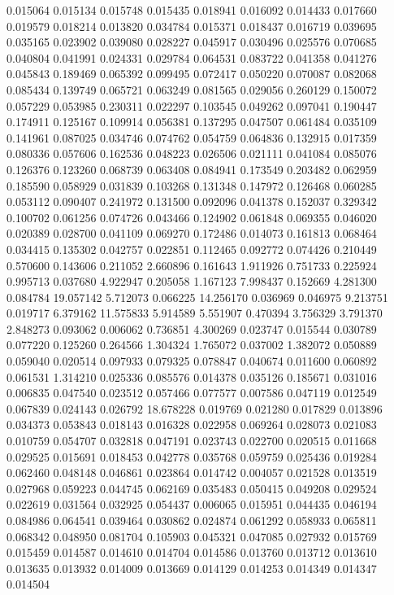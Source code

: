 0.015064
0.015134
0.015748
0.015435
0.018941
0.016092
0.014433
0.017660
0.019579
0.018214
0.013820
0.034784
0.015371
0.018437
0.016719
0.039695
0.035165
0.023902
0.039080
0.028227
0.045917
0.030496
0.025576
0.070685
0.040804
0.041991
0.024331
0.029784
0.064531
0.083722
0.041358
0.041276
0.045843
0.189469
0.065392
0.099495
0.072417
0.050220
0.070087
0.082068
0.085434
0.139749
0.065721
0.063249
0.081565
0.029056
0.260129
0.150072
0.057229
0.053985
0.230311
0.022297
0.103545
0.049262
0.097041
0.190447
0.174911
0.125167
0.109914
0.056381
0.137295
0.047507
0.061484
0.035109
0.141961
0.087025
0.034746
0.074762
0.054759
0.064836
0.132915
0.017359
0.080336
0.057606
0.162536
0.048223
0.026506
0.021111
0.041084
0.085076
0.126376
0.123260
0.068739
0.063408
0.084941
0.173549
0.203482
0.062959
0.185590
0.058929
0.031839
0.103268
0.131348
0.147972
0.126468
0.060285
0.053112
0.090407
0.241972
0.131500
0.092096
0.041378
0.152037
0.329342
0.100702
0.061256
0.074726
0.043466
0.124902
0.061848
0.069355
0.046020
0.020389
0.028700
0.041109
0.069270
0.172486
0.014073
0.161813
0.068464
0.034415
0.135302
0.042757
0.022851
0.112465
0.092772
0.074426
0.210449
0.570600
0.143606
0.211052
2.660896
0.161643
1.911926
0.751733
0.225924
0.995713
0.037680
4.922947
0.205058
1.167123
7.998437
0.152669
4.281300
0.084784
19.057142
5.712073
0.066225
14.256170
0.036969
0.046975
9.213751
0.019717
6.379162
11.575833
5.914589
5.551907
0.470394
3.756329
3.791370
2.848273
0.093062
0.006062
0.736851
4.300269
0.023747
0.015544
0.030789
0.077220
0.125260
0.264566
1.304324
1.765072
0.037002
1.382072
0.050889
0.059040
0.020514
0.097933
0.079325
0.078847
0.040674
0.011600
0.060892
0.061531
1.314210
0.025336
0.085576
0.014378
0.035126
0.185671
0.031016
0.006835
0.047540
0.023512
0.057466
0.077577
0.007586
0.047119
0.012549
0.067839
0.024143
0.026792
18.678228
0.019769
0.021280
0.017829
0.013896
0.034373
0.053843
0.018143
0.016328
0.022958
0.069264
0.028073
0.021083
0.010759
0.054707
0.032818
0.047191
0.023743
0.022700
0.020515
0.011668
0.029525
0.015691
0.018453
0.042778
0.035768
0.059759
0.025436
0.019284
0.062460
0.048148
0.046861
0.023864
0.014742
0.004057
0.021528
0.013519
0.027968
0.059223
0.044745
0.062169
0.035483
0.050415
0.049208
0.029524
0.022619
0.031564
0.032925
0.054437
0.006065
0.015951
0.044435
0.046194
0.084986
0.064541
0.039464
0.030862
0.024874
0.061292
0.058933
0.065811
0.068342
0.048950
0.081704
0.105903
0.045321
0.047085
0.027932
0.015769
0.015459
0.014587
0.014610
0.014704
0.014586
0.013760
0.013712
0.013610
0.013635
0.013932
0.014009
0.013669
0.014129
0.014253
0.014349
0.014347
0.014504

